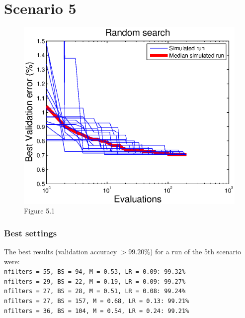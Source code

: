 \documentclass{article}
\begin{document}
    
    
\section*{Scenario 5}
    
    \begin{figure}[!htb]
        \centering
        \includegraphics[width=\textwidth]{figures/sc5}
        \captionsetup{labelformat=empty}
        \caption{Figure 5.1}
    \end{figure}
    
    \subsubsection*{Best settings}
        The best results (validation accuracy $> 99.20\%$) for a run of the 5th scenario were:
        \vspace{10px}\\
        \texttt{nfilters = 55, BS = 94, M = 0.53, LR = 0.09: 99.32\%} \\
        \texttt{nfilters = 29, BS = 22, M = 0.19, LR = 0.09: 99.27\%} \\
        \texttt{nfilters = 27, BS = 28,	M = 0.51, LR = 0.08: 99.24\%} \\
        \texttt{nfilters = 27, BS = 157, M = 0.68, LR = 0.13: 99.21\%} \\
        \texttt{nfilters = 36, BS = 104, M = 0.54, LR = 0.24: 99.21\%} \\
        
\end{document}
